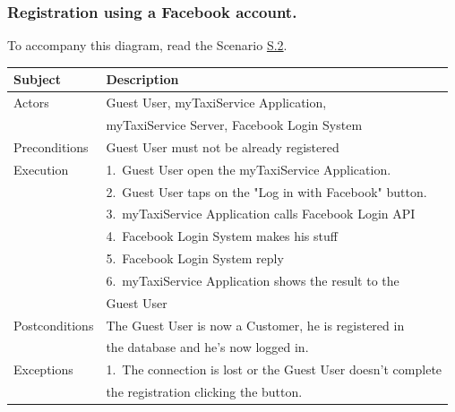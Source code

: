 \subsubsection{Registration using a Facebook account.}

	To accompany this diagram, read the Scenario \hyperref[sec:FacebookCustomerRegistrationScenario]{S.2}.

				\begin{table}[htpb]
					\centering
					\label{tab:FacebookCustomerRegistrationDiagramTable}
					\begin{tabularx}{\textwidth}{ll}
						\hline
						\hline
							\textbf{Subject}
						& 
							\textbf{Description}\\
						\hline
							Actors	       &  Guest User, myTaxiService Application, \\
							               &  myTaxiService Server, Facebook Login System\\
						\hline
							Preconditions  &  Guest User must not be already registered\\
						\hline
							Execution      &  1.~Guest User open the myTaxiService Application.\\
										   &  2.~Guest User taps on the "Log in with Facebook" button.\\
										   &  3.~myTaxiService Application calls Facebook Login API\\
										   &  4.~Facebook Login System makes his stuff\\
										   &  5.~Facebook Login System reply\\
										   &  6.~myTaxiService Application shows the result to the \\
										   &     Guest User\\
						\hline
							Postconditions &  The Guest User is now a Customer, he is registered in \\ 
										   &  the database and he's now logged in.\\
						\hline
							Exceptions     &  1.~The connection is lost or the Guest User doesn't complete\\ 
										   &     the registration clicking the button.\\
									
						\hline
						\hline
					\end{tabularx}
				\end{table}

